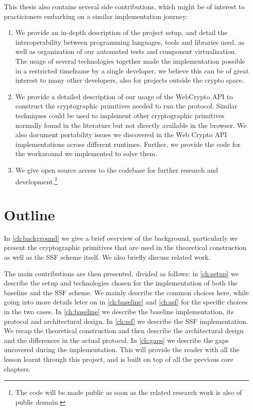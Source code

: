 This thesis also contains several side contributions, which might be of interest to
practicioners embarking on a similar implementation journey:
\begin{enumerate}
    \item We provide an in-depth description of the project setup, and detail the interoperability between programming languages, tools and libraries used, as well as organization of our automated tests and component virtualization. The usage of several technologies together made the implementation possible in a restricted timeframe by a single developer, we believe this can be of great interest to many other developers, also for projects outside the crypto space. 
    \item We provide a detailed description of our usage of the WebCrypto API to construct the cryptographic primitives needed to run the protocol. Similar techniques could be used to implement other cryptographic primitives normally found in the literature but not directly available in the browser. We also document portability issues we discovered in the Web Crypto API implementations across different runtimes. Further, we provide the code for the workaround we implemented to solve them.
    \item We give open source access to the codebase for further research and development.\footnote{The code will be made public as soon as the related research work is also of public domain.}
\end{enumerate}

\section{Outline}

In \cref{ch:background} we give a brief overview of the background, particularly 
we present the cryptographic primitives that are used in the theoretical construction 
as well as the SSF scheme itself. We also briefly discuss related work. 

The main contributions are then presented, divided as follows: 
in \cref{ch:setup} we describe the setup and technologies chosen for the implementation of both the baseline and the SSF scheme. We mainly describe the common choices here, while going into more details leter on in \cref{ch:baseline} and \cref{ch:ssf} for the specific choices in the two cases.
In \cref{ch:baseline} we describe the baseline implementation, its protocol and architectural design.
In \cref{ch:ssf} we describe the SSF implementation. We recap the theoretical construction and then describe the architectural design and the differences in the actual protocol.
In \cref{ch:gaps} we describe the gaps uncovered during the implementation. This will provide the reader with all the lesson learnt through this project, and is built on top of all the previous core chapters.

